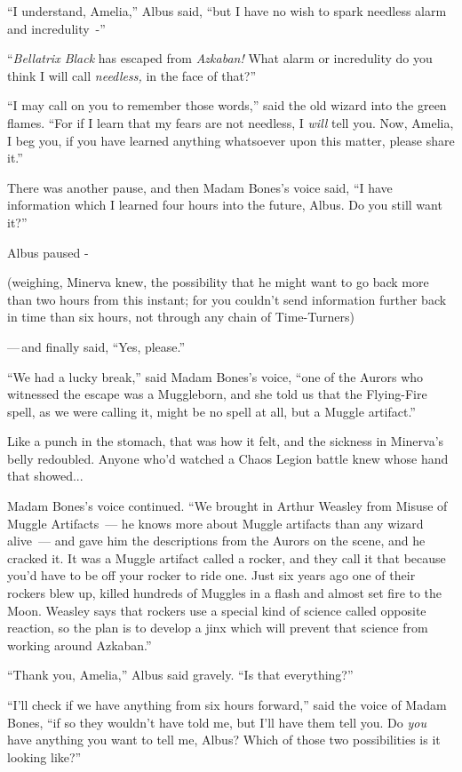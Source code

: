 ``I understand, Amelia,'' Albus said, ``but I have no wish to spark needless alarm and incredulity~-''

``\emph{Bellatrix Black} has escaped from \emph{Azkaban!} What alarm or incredulity do you think I will call \emph{needless,} in the face of that?''

``I may call on you to remember those words,'' said the old wizard into the green flames. ``For if I learn that my fears are not needless, I \emph{will} tell you. Now, Amelia, I beg you, if you have learned anything whatsoever upon this matter, please share it.''

There was another pause, and then Madam Bones's voice said, ``I have information which I learned four hours into the future, Albus. Do you still want it?''

Albus paused -

(weighing, Minerva knew, the possibility that he might want to go back more than two hours from this instant; for you couldn't send information further back in time than six hours, not through any chain of Time-Turners)

---\,and finally said, ``Yes, please.''

``We had a lucky break,'' said Madam Bones's voice, ``one of the Aurors who witnessed the escape was a Muggleborn, and she told us that the Flying-Fire spell, as we were calling it, might be no spell at all, but a Muggle artifact.''

Like a punch in the stomach, that was how it felt, and the sickness in Minerva's belly redoubled. Anyone who'd watched a Chaos Legion battle knew whose hand that showed...

Madam Bones's voice continued. ``We brought in Arthur Weasley from Misuse of Muggle Artifacts~--- he knows more about Muggle artifacts than any wizard alive~--- and gave him the descriptions from the Aurors on the scene, and he cracked it. It was a Muggle artifact called a rocker, and they call it that because you'd have to be off your rocker to ride one. Just six years ago one of their rockers blew up, killed hundreds of Muggles in a flash and almost set fire to the Moon. Weasley says that rockers use a special kind of science called opposite reaction, so the plan is to develop a jinx which will prevent that science from working around Azkaban.''

``Thank you, Amelia,'' Albus said gravely. ``Is that everything?''

``I'll check if we have anything from six hours forward,'' said the voice of Madam Bones, ``if so they wouldn't have told me, but I'll have them tell you. Do \emph{you} have anything you want to tell me, Albus? Which of those two possibilities is it looking like?''

